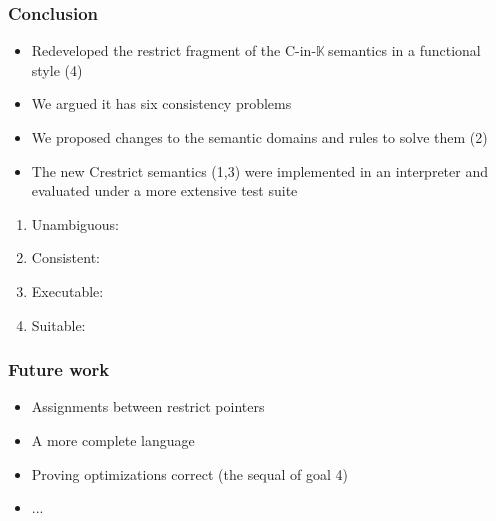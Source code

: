 \documentclass[aspectratio=169, c]{beamer}
\def\cink{C-in-$\mathbb{K}\ $}
\newcommand{\cmark}{\ding{51}}%
\begin{document}
\begin{frame}
\frametitle{Conclusion}
\begin{itemize}
    \item Redeveloped the restrict fragment of the \cink semantics in a functional style (4)
    \item We argued it has six consistency problems
    \item We proposed changes to the semantic domains and rules to solve them (2)
    \item The new Crestrict semantics (1,3) were implemented in an interpreter and evaluated under a more extensive test suite   
\end{itemize}

\begin{enumerate}
    \item \textcolor{ao}{Unambiguous: \cmark}
    \item \textcolor{ao}{Consistent: \cmark}
    \item \textcolor{ao}{Executable: \cmark}
    \item \textcolor{ao}{Suitable: \cmark}
\end{enumerate}

\end{frame}


\begin{frame}
\frametitle{Future work}
\begin{itemize}
    \item Assignments between restrict pointers
    \item A more complete language
    \item Proving optimizations correct (the sequal of goal 4)
    \item ...
\end{itemize}
\end{frame}





\begin{frame}
\frametitle{}
\end{frame}







\end{document}
